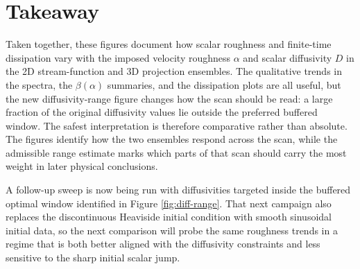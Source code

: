 \documentclass[11pt]{article}
\begin{document}
\FloatBarrier
\section{Takeaway}
Taken together, these figures document how scalar roughness and finite-time
dissipation vary with the imposed velocity roughness $\alpha$ and scalar diffusivity
$D$ in the 2D stream-function and 3D projection ensembles. The qualitative trends in
the spectra, the $\beta(\alpha)$ summaries, and the dissipation plots are all useful,
but the new diffusivity-range figure changes how the scan should be read: a large
fraction of the original diffusivity values lie outside the preferred buffered
window. The safest interpretation is therefore comparative rather than absolute. The
figures identify how the two ensembles respond across the scan, while the admissible
range estimate marks which parts of that scan should carry the most weight in later
physical conclusions.

A follow-up sweep is now being run with diffusivities targeted inside the buffered
optimal window identified in Figure \ref{fig:diff-range}. That next campaign also
replaces the discontinuous Heaviside initial condition with smooth sinusoidal initial
data, so the next comparison will probe the same roughness trends in a regime that
is both better aligned with the diffusivity constraints and less sensitive to the
sharp initial scalar jump.
\end{document}
